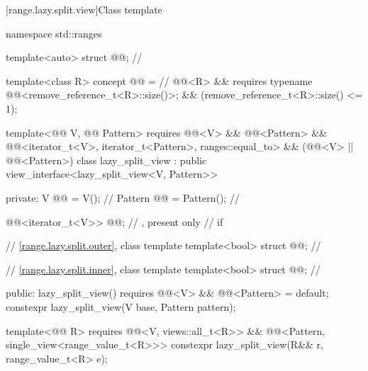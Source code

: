 [range.lazy.split.view]{Class template }

%
%
%
%
\begin{codeblock}
namespace std::ranges {
  template<auto> struct @@;                       // \expos

  template<class R>
  concept @@ =                                          // \expos
    @@<R> &&
    requires { typename @@<remove_reference_t<R>::size()>; } &&
    (remove_reference_t<R>::size() <= 1);

  template<@@ V, @@ Pattern>
    requires @@<V> && @@<Pattern> &&
             @@<iterator_t<V>, iterator_t<Pattern>, ranges::equal_to> &&
             (@@<V> || @@<Pattern>)
  class lazy_split_view : public view_interface<lazy_split_view<V, Pattern>> {
  private:
    V @@ = V();                                              // \expos
    Pattern @@ = Pattern();                               // \expos

    @@<iterator_t<V>> @@;              // \expos, present only
                                                                // if 

    // \ref{range.lazy.split.outer}, class template 
    template<bool> struct @@;                       // \expos

    // \ref{range.lazy.split.inner}, class template 
    template<bool> struct @@;                       // \expos

  public:
    lazy_split_view()
      requires @@<V> && @@<Pattern> = default;
    constexpr lazy_split_view(V base, Pattern pattern);

    template<@@ R>
      requires @@<V, views::all_t<R>> &&
               @@<Pattern, single_view<range_value_t<R>>>
    constexpr lazy_split_view(R&& r, range_value_t<R> e);

}}
\end{codeblock}
